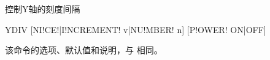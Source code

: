 \label{cmd:ydiv}

控制Y轴的刻度间隔

\begin{SACSTX}
YDIV [NI!CE!|I!NCREMENT! v|NU!MBER! n] [P!OWER! ON|OFF]
\end{SACSTX}

该命令的选项、默认值和说明，与  相同。
